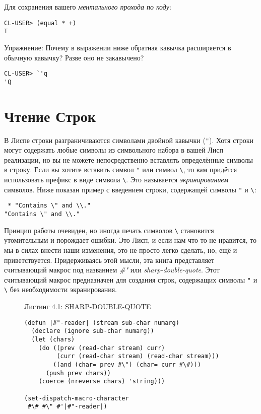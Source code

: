 Для сохранения вашего \emph{ментального прохода по коду}:

\begin{verbatim}
CL-USER> (equal * +)
T
\end{verbatim}

Упражнение: Почему в выражении ниже обратная кавычка расширяется в обычную кавычку? Разве оно не закавычено?

\begin{verbatim}
CL-USER> `'q
'Q
\end{verbatim}

\section{Чтение Строк}\label{section_reading_strings}

В Лиспе строки разграничиваются символами двойной кавычки (\verb|"|). Хотя строки могут содержать любые символы из символьного набора в вашей Лисп реализации, но вы не можете непосредственно вставлять определённые символы в строку. Если вы хотите вставить символ \verb|"| или символ \verb"\", то вам придётся использовать префикс в виде символа \verb"\". Это называется \emph{экранированием} символов. Ниже показан пример с введением строки, содержащей символы \verb|"| и \verb"\":

\begin{verbatim}
 * "Contains \" and \\."
"Contains \" and \\."
\end{verbatim}

Принцип работы очевиден, но иногда печать символов \verb"\" становится утомительным и порождает ошибки. Это Лисп, и если нам что-то не нравится, то мы в силах внести наши изменения, это не просто легко сделать, но, ещё и приветствуется. Придерживаясь этой мысли, эта книга представляет считывающий макрос под названием \emph{\#"} или \emph{sharp-double-quote}. Этот считывающий макрос предназначен для создания строк, содержащих символы \verb|"| и \verb"\" без необходимости экранирования.

\begin{figure}Листинг 4.1: SHARP-DOUBLE-QUOTE\label{listing_4.1}
\listbegin
\begin{verbatim}
(defun |#"-reader| (stream sub-char numarg)
  (declare (ignore sub-char numarg))
  (let (chars)
    (do ((prev (read-char stream) curr)
         (curr (read-char stream) (read-char stream)))
        ((and (char= prev #\") (char= curr #\#)))
      (push prev chars))
    (coerce (nreverse chars) 'string)))

(set-dispatch-macro-character
 #\# #\" #'|#"-reader|)
\end{verbatim}
\listend
\end{figure}

